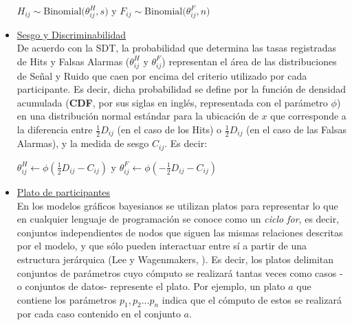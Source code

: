 \begin{itemize}

\begin{center}
$H_{ij}\sim \mathrm{Binomial}\bigl(\theta^H_{ij}, s)$ \qquad y \qquad $F_{ij}\sim \mathrm{Binomial}\bigl(\theta^F_{ij}, n)$\\
\end{center}

\item \underline{Sesgo y Discriminabilidad}\\

De acuerdo con la SDT, la probabilidad que determina las tasas registradas de Hits y Falsas Alarmas ($\theta^H_{ij}$ y $\theta^F_{ij}$) representan el área de las distribuciones de Señal y Ruido que caen por encima del criterio utilizado por cada participante. Es decir, dicha probabilidad se define por la función de densidad acumulada (\textbf{CDF}, por sus siglas en inglés, representada con el parámetro $\phi$) en una distribución normal estándar para la ubicación de $x$ que corresponde a la diferencia entre $\frac{1}{2}D_{ij}$ (en el caso de los Hits) o $\frac{1}{2}D_{ij}$ (en el caso de las Falsas Alarmas), y la medida de sesgo $C_{ij}$. Es decir:

\begin{center}
$\theta^H_{ij}\gets \phi (\frac{1}{2}D_{ij}-C_{ij})$ \qquad y \qquad $\theta^F_{ij}\gets \phi (-\frac{1}{2}D_{ij}-C_{ij})$\\
\end{center}

\item \underline{Plato de participantes}\\

En los modelos gráficos bayesianos se utilizan platos para representar lo que en cualquier lenguaje de programación se conoce como un \textit{ciclo for}, es decir, conjuntos independientes de nodos que siguen las mismas relaciones descritas por el modelo, y que sólo pueden interactuar entre sí a partir de una estructura jerárquica (Lee y Wagenmakers, \citeyear{LeeBook}). Es decir, los platos delimitan conjuntos de parámetros cuyo cómputo se realizará tantas veces como casos -o conjuntos de datos- represente el plato. Por ejemplo, un plato $a$ que contiene los parámetros $p_1, p_2... p_n$ indica que el cómputo de estos se realizará por cada caso contenido en el conjunto $a$.\\


\end{itemize}
